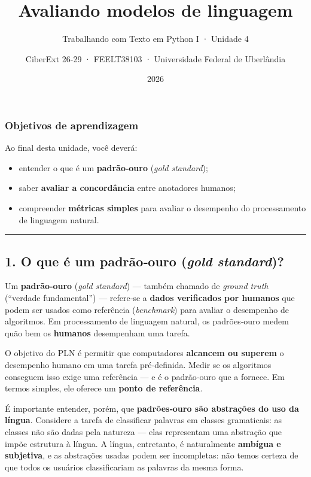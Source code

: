 \documentclass[
  brazilian,
  11pt,
]{article}
\title{Avaliando modelos de linguagem}
\subtitle{Trabalhando com Texto em Python I · Unidade 4}
\author{CiberExt 26-29 · FEELT38103 · Universidade Federal de
Uberlândia}
\date{2026}
\providecommand{\tightlist}{%
  \setlength{\itemsep}{0pt}\setlength{\parskip}{0pt}}
\begin{document}
\maketitle

{
\setcounter{tocdepth}{2}
\tableofcontents
}
\subsubsection{Objetivos de
aprendizagem}\label{objetivos-de-aprendizagem}

Ao final desta unidade, você deverá:

\begin{itemize}
\tightlist
\item
  entender o que é um \textbf{padrão‑ouro} (\emph{gold standard});
\item
  saber \textbf{avaliar a concordância} entre anotadores humanos;
\item
  compreender \textbf{métricas simples} para avaliar o desempenho do
  processamento de linguagem natural.
\end{itemize}

\begin{center}\rule{0.5\linewidth}{0.5pt}\end{center}

\subsection{\texorpdfstring{1. O que é um padrão‑ouro (\emph{gold
standard})?}{1. O que é um padrão‑ouro (gold standard)?}}\label{o-que-uxe9-um-padruxe3oouro-gold-standard}

Um \textbf{padrão‑ouro} (\emph{gold standard}) --- também chamado de
\emph{ground truth} (``verdade fundamental'') --- refere‑se a
\textbf{dados verificados por humanos} que podem ser usados como
referência (\emph{benchmark}) para avaliar o desempenho de algoritmos.
Em processamento de linguagem natural, os padrões‑ouro medem quão bem os
\textbf{humanos} desempenham uma tarefa.

O objetivo do PLN é permitir que computadores \textbf{alcancem ou
superem} o desempenho humano em uma tarefa pré‑definida. Medir se os
algoritmos conseguem isso exige uma referência --- e é o padrão‑ouro que
a fornece. Em termos simples, ele oferece um \textbf{ponto de
referência}.

É importante entender, porém, que \textbf{padrões‑ouro são abstrações do
uso da língua}. Considere a tarefa de classificar palavras em classes
gramaticais: as classes não são dadas pela natureza --- elas representam
uma abstração que impõe estrutura à língua. A língua, entretanto, é
naturalmente \textbf{ambígua e subjetiva}, e as abstrações usadas podem
ser incompletas: não temos certeza de que todos os usuários
classificariam as palavras da mesma forma.
\end{document}
